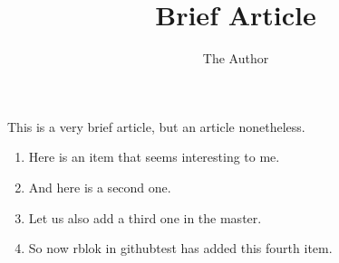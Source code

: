 \documentclass[11pt]{amsart}
\title{Brief Article}
\author{The Author}
\begin{document}
\maketitle
This is a very brief article, but an article nonetheless.
\begin{enumerate}
\item Here is an item that seems interesting to me.
\item And here is a second one.
\item Let us also add a third one in the master.
\item So now rblok in githubtest has added this fourth item.
\end{enumerate}


\end{document}
